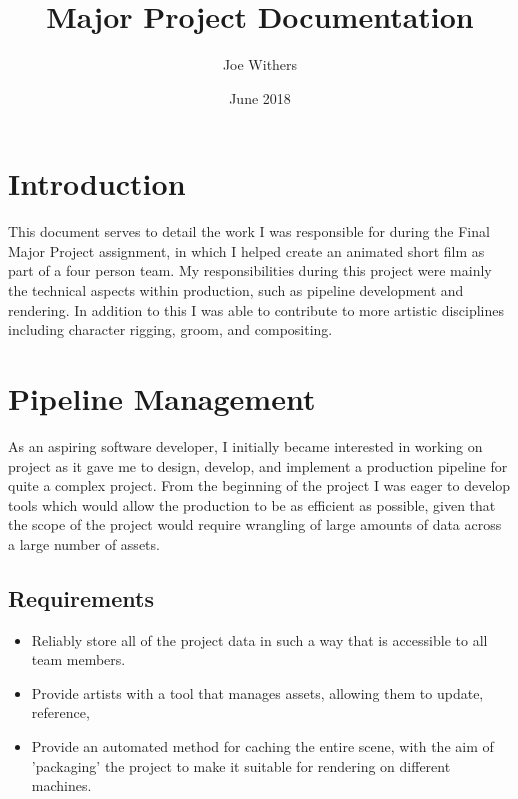 \documentclass[11pt]{article}
\title{\textbf{Major Project Documentation}}
\author{Joe Withers}
\date{June 2018}
\begin{document}
\maketitle

\tableofcontents
\newpage

\section{Introduction}

This document serves to detail the work I was responsible for during the Final Major Project assignment, in which I helped create an animated short film as part of a four person team. My responsibilities during this project were mainly the technical aspects within production, such as pipeline development and rendering. In addition to this I was able to contribute to more artistic disciplines including character rigging, groom, and compositing.

\section{Pipeline Management}

As an aspiring software developer, I initially became interested in working on project as it gave me to design, develop, and implement a production pipeline for quite a complex project. From the beginning of the project I was eager to develop tools which would allow the production to be as efficient as possible, given that the scope of the project would require wrangling of large amounts of data across a large number of assets.

\subsection{Requirements}

\begin{itemize}

\item Reliably store all of the project data in such a way that is accessible to all team members.

\item Provide artists with a tool that manages assets, allowing them to update, reference,

\item Provide an automated method for caching the entire scene, with the aim of 'packaging' the project to make it suitable for rendering on different machines.

\end{itemize}
\end{document}
